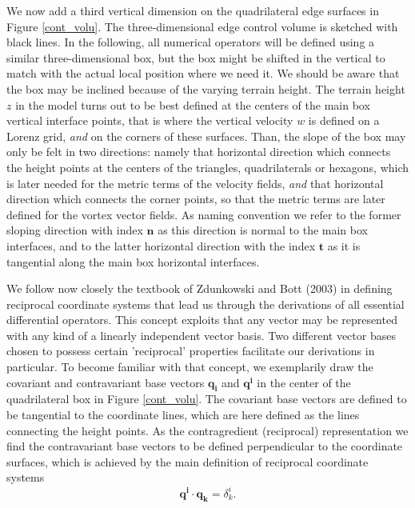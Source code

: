We now add a third vertical dimension on the quadrilateral edge surfaces
in Figure \ref{cont_volu}. The three-dimensional edge control volume is
sketched with black lines. In the following, all numerical operators will be
defined using a similar three-dimensional box, but the box might be shifted in the
vertical to match with the actual local position where we need it.
We should be aware that the box may be inclined because of the varying terrain height.
The terrain height $z$ in the model turns out to be best defined at the centers of
the main box vertical interface points, that is where the vertical velocity $w$ is defined on
a Lorenz grid, \textit{and} on the corners of these surfaces. Than, the slope of the
box may only be felt in two directions: namely that horizontal direction which connects the height points at the centers of the triangles, quadrilaterals or hexagons, which is later needed for the metric terms of the velocity fields, \textit{and} that horizontal direction which connects the corner points, so that the metric terms are
later defined for the vortex vector fields.
As naming convention we refer to the former sloping direction with index
$\mathbf{n}$ as this direction is normal to the main box interfaces,
and to the latter horizontal direction with the index $\mathbf{t}$ as it is
tangential along the main box horizontal interfaces.

We follow now closely the textbook of Zdunkowski and Bott (2003) in defining
reciprocal coordinate systems that lead us through the derivations of all
essential differential operators. This concept exploits that any vector may be represented
with any kind of a linearly independent vector basis.
Two different vector bases chosen to possess certain 'reciprocal' properties
facilitate our derivations in particular.
To become familiar with that concept, we exemplarily draw the
covariant and contravariant base vectors
$\mathbf{q_i}$ and $\mathbf{q^i}$ in the center of the quadrilateral box in
Figure \ref{cont_volu}.
The covariant base vectors are defined to be tangential to the
coordinate lines, which are here defined as the lines connecting the height
points. As the contragredient (reciprocal) representation we
find the contravariant base vectors to be defined perpendicular to the coordinate surfaces,
which is achieved by the main definition of reciprocal coordinate systems
\begin{equation}
 \mathbf{q^i}\cdot\mathbf{q_k}=\delta_k^i.
\label{contragredient}
\end{equation}

